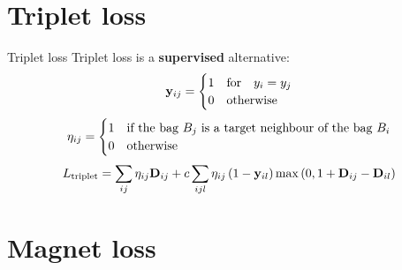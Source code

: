 \documentclass[10pt]{beamer}
\newcommand{\mathmat}{\ensuremath{\mathbf}}
\begin{document}
\section{Triplet loss}

\begin{frame}{Triplet loss}
	Triplet loss is a \textbf{supervised} alternative:
	\[ \mathmat{y}_{ij} =
\begin{cases}
	1 &\text{for} \quad y_i = y_j \\
	0 &\text{otherwise}
\end{cases}
\]
\[ \mathmat{\eta}_{ij} = \begin{cases}
		1 &\text{if the bag } B_j \text{ is a target neighbour of the bag } B_i \\
		0 &\text{otherwise}
  \end{cases} \]
	\[ L_\mathrm{triplet} = \sum_{ij} \eta_{ij} \mathmat{D}_{ij} + c \sum_{ijl} \eta_{ij} \left( 1 - \mathmat{y}_{il} \right) \max \left( 0, 1 + \mathmat{D}_{ij} - \mathmat{D}_{il} \right) \]
\end{frame}

\section{Magnet loss}
\end{document}

